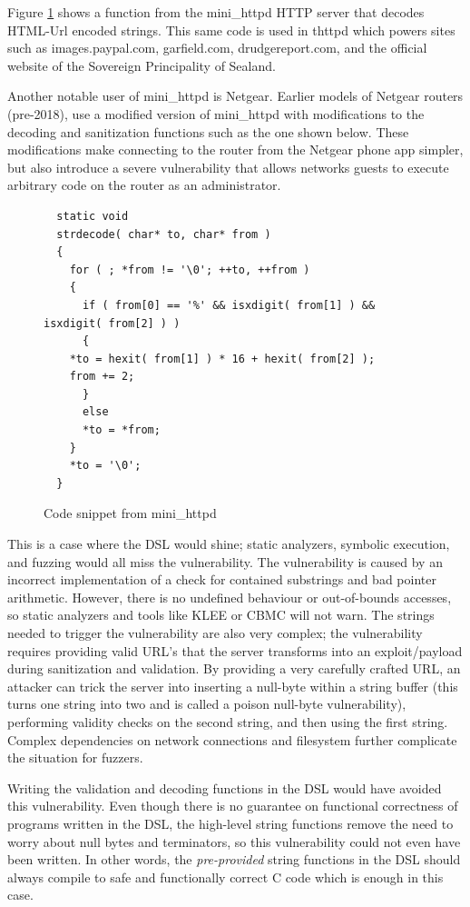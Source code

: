 \documentclass[letterpaper]{article}
\begin{document}
Figure \ref{fig:minihttpd} shows a function from the mini\_httpd
HTTP server that decodes HTML-Url encoded strings. This
same code is used in thttpd which powers sites such as
images.paypal.com, garfield.com, drudgereport.com, and
the official website of the Sovereign Principality of Sealand.

Another notable user of mini\_httpd is Netgear. Earlier
models of Netgear routers (pre-2018), use a modified version of mini\_httpd
with modifications to the decoding and sanitization functions such as
the one shown below. These modifications make connecting to the router
from the Netgear phone app simpler, but also introduce a severe vulnerability
that allows networks guests to execute arbitrary code on the router
as an administrator.


\begin{figure}
\centering
\begin{lstlisting}
  static void
  strdecode( char* to, char* from )
  {
    for ( ; *from != '\0'; ++to, ++from )
    {
      if ( from[0] == '%' && isxdigit( from[1] ) && isxdigit( from[2] ) )
      {
	*to = hexit( from[1] ) * 16 + hexit( from[2] );
	from += 2;
      }
      else
      *to = *from;
    }
    *to = '\0';
  }
\end{lstlisting}
\caption{Code snippet from mini\_httpd}
\label{fig:minihttpd}
\end{figure}

This is a case where the DSL would shine; static analyzers, symbolic
execution, and fuzzing would all miss the vulnerability. The vulnerability
is caused by an incorrect implementation of a check for contained substrings
and bad pointer arithmetic. However, there is no undefined behaviour or
out-of-bounds accesses, so static analyzers and tools like KLEE or CBMC
will not warn. The strings needed to trigger the vulnerability are also
very complex; the vulnerability requires providing valid URL's that the
server transforms into an exploit/payload during sanitization and validation.
By providing a very carefully crafted URL, an attacker can trick the server
into inserting a null-byte within a string buffer (this turns one string into
two and is called a poison null-byte vulnerability), performing validity checks on the
second string, and then using the first string. Complex dependencies on
network connections and filesystem further complicate the situation for fuzzers.

Writing the validation and decoding functions in the DSL would have avoided
this vulnerability. Even though there is no guarantee on functional correctness
of programs written in the DSL, the high-level string functions remove the
need to worry about null bytes and terminators, so this vulnerability could not
even have been written. In other words, the \textit{pre-provided} string functions in the DSL
should always compile to safe and functionally correct C code which is enough
in this case.
\end{document}
